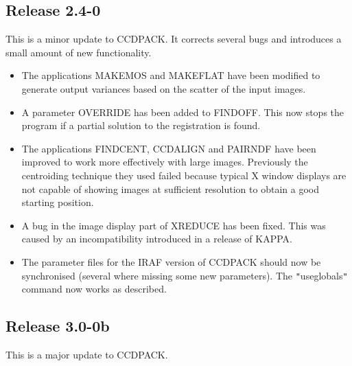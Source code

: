 \documentclass[twoside,11pt]{article}
\newcommand{\htmlref}[2]{#1}
\renewcommand{\_}{\texttt{\symbol{95}}}
\newcommand{\qt}[1]{{\tt "}#1{\tt "}}
\newcommand{\xroutine}[1]{\htmlref{{\sc #1}}{#1}}
\begin{document}
\subsection{Release 2.4-0}
This is a minor update to CCDPACK. It corrects several bugs and
introduces a small amount of new functionality.
\begin{itemize}
\item The applications \xroutine{MAKEMOS} and \xroutine{MAKEFLAT} have
  been modified to generate output variances based on the scatter of
  the input images.
\item A parameter OVERRIDE has been added to \xroutine{FINDOFF}. This
  now stops the program if a partial solution to the registration is
  found.
\item The applications \xroutine{FINDCENT}, \xroutine{CCDALIGN}
      and \xroutine{PAIRNDF} have been improved to work more
      effectively with large images. Previously the centroiding
      technique they used failed because typical X window displays
      are not capable of showing images at sufficient
      resolution to obtain a good starting position.
\item A bug in the image display part of \xroutine{XREDUCE} has been
        fixed. This was caused by an incompatibility introduced in a
        release of KAPPA.
\item The parameter files for the IRAF version of CCDPACK should now
      be synchronised (several where missing some new parameters). The
      \qt{use\_globals} command now works as described.
\end{itemize}


\subsection{Release 3.0-0b}

This is a major update to CCDPACK.
\end{document}
